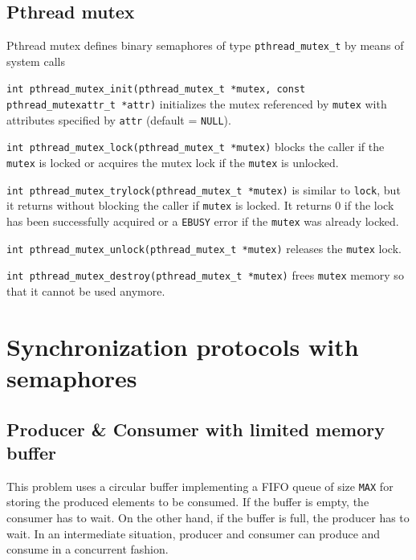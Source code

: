\subsection{Pthread mutex}
Pthread mutex defines binary semaphores of type \texttt{pthread\_mutex\_t} by means of system calls
\begin{description}
\item \texttt{int pthread\_mutex\_init(pthread\_mutex\_t *mutex, \newline const pthread\_mutexattr\_t *attr)} initializes the mutex referenced by \texttt{mutex} with attributes specified by \texttt{attr} (default = \texttt{NULL}).

\item \texttt{int pthread\_mutex\_lock(pthread\_mutex\_t *mutex)} blocks the caller if the \texttt{mutex} is locked or acquires the mutex lock if the \texttt{mutex} is unlocked.

\item \texttt{int pthread\_mutex\_trylock(pthread\_mutex\_t *mutex)} is similar to \texttt{lock}, but it returns without blocking the caller if \texttt{mutex} is locked. It returns 0 if the lock has been successfully acquired or a \texttt{EBUSY} error if  the \texttt{mutex} was already locked.

\item \texttt{int pthread\_mutex\_unlock(pthread\_mutex\_t *mutex)} releases the \texttt{mutex} lock.

\item \texttt{int pthread\_mutex\_destroy(pthread\_mutex\_t *mutex)} frees \texttt{mutex} memory so that it cannot be used anymore.
\end{description}

\section{Synchronization protocols with semaphores}
\subsection{Producer \& Consumer with limited memory buffer}
This problem uses a circular buffer implementing a FIFO queue of size \texttt{MAX} for storing the produced elements to be consumed. If the buffer is empty, the consumer has to wait. On the other hand, if the buffer is full, the producer has to wait. In an intermediate situation, producer and consumer can produce and consume in a concurrent fashion.

